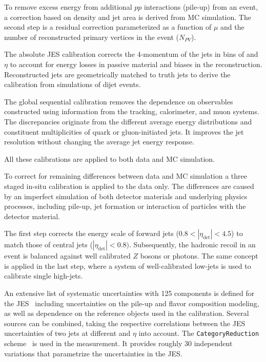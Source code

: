 To remove excess energy from additional $pp$ interactions (pile-up) from an event, a correction based on \pt density and jet area is derived from MC simulation.
The second step is a residual correction parameterized as a function of 
$\mu$ and the number of reconstructed primary vertices in the event ($N_{PV}$). 

The absolute JES calibration corrects the 4-momentum of the jets in bins of \pt and $\eta$ to account for energy losses in passive material and biases in the reconstruction.
Reconstructed jets are geometrically matched to truth jets to derive the calibration from
simulations of dĳet events.

The global sequential calibration removes the dependence on observables constructed using information from the tracking, calorimeter, and muon systems.
The discrepancies originate from the different average energy distributions and constituent multiplicities of quark or gluon-initiated jets.
It improves the jet resolution without changing the average jet energy response.

All these calibrations are applied to both data and MC
simulation. 

To correct for remaining differences between data and MC simulation
a three staged in-situ calibration is applied to the data only.
The differences are caused by an imperfect simulation of both detector materials and
underlying physics processes, including pile-up, jet formation or interaction of particles with the detector material.

The first step corrects the energy scale of forward jets ($0.8 < |\eta_\text{det}| < 4.5$) to match those of central jets ($|\eta_\text{det}| < 0.8)$.
Subsequently, the hadronic recoil in an event is balanced against well calibrated $Z$ bosons or photons. The same concept is applied in the last step, where a system of well-calibrated low-\pt jets is used to calibrate single high-\pt jets. %

An extensive list of systematic uncertainties with 125 components is defined for the JES~\cite{JETM-2018-05} including uncertainties on the pile-up and flavor composition modeling, as well as dependence on the reference objects used in the calibration.
Several sources can be combined, taking the respective correlations between the JES uncertainties of two jets at different \pt and $\eta$ into account.
The \verb|CategoryReduction| scheme~\cite{web:JetSystematics} is used in the measurement. It provides roughly 30 independent variations that parametrize the uncertainties in the JES.

